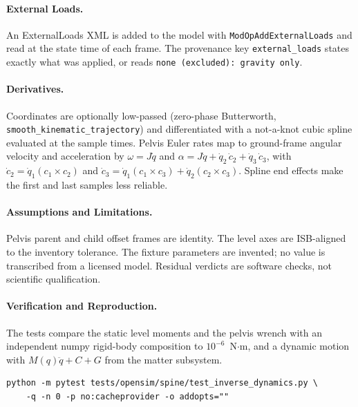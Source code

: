 \paragraph{External Loads.}
An ExternalLoads XML is added to the model with \texttt{ModOpAddExternalLoads}
and read at the state time of each frame. The provenance key
\texttt{external\_loads} states exactly what was applied, or reads
\texttt{none (excluded): gravity only}.

\paragraph{Derivatives.}
Coordinates are optionally low-passed (zero-phase Butterworth,
\texttt{smooth\_kinematic\_trajectory}) and differentiated with a not-a-knot
cubic spline evaluated at the sample times. Pelvis Euler rates map to
ground-frame angular velocity and acceleration by
$\omega = J\dot q$ and
$\alpha = J\ddot q + \dot q_2\,\dot c_2 + \dot q_3\,\dot c_3$, with
$\dot c_2=\dot q_1(c_1\times c_2)$ and
$\dot c_3=\dot q_1(c_1\times c_3)+\dot q_2(c_2\times c_3)$. Spline end
effects make the first and last samples less reliable.

\paragraph{Assumptions and Limitations.}
Pelvis parent and child offset frames are identity. The level axes are
ISB-aligned to the inventory tolerance. The fixture parameters are invented;
no value is transcribed from a licensed model. Residual verdicts are software
checks, not scientific qualification.

\paragraph{Verification and Reproduction.}
The tests compare the static level moments and the pelvis wrench with an
independent numpy rigid-body composition to $10^{-6}$~N$\cdot$m, and a dynamic
motion with $M(q)\ddot q + C + G$ from the matter subsystem.
\begin{verbatim}
python -m pytest tests/opensim/spine/test_inverse_dynamics.py \
    -q -n 0 -p no:cacheprovider -o addopts=""
\end{verbatim}
